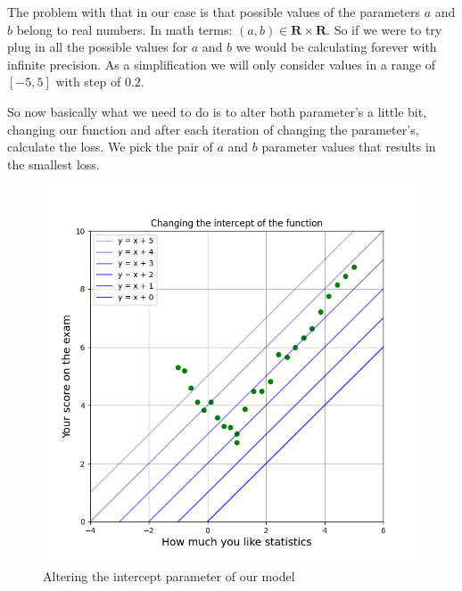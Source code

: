 \documentclass{article}
\begin{document}
    The problem with that in our case is that possible values of the parameters $a$ and $b$ belong to real numbers.
    In math terms: $(a, b) \in \mathbf{R}\times\mathbf{R}$.
    So if we were to try plug in all the possible values for $a$ and $b$ we would be calculating forever with infinite precision.
    As a simplification we will only consider values in a range of $[-5,5]$ with step of $0.2$.

    So now basically what we need to do is to alter both parameter's a little bit, changing our function and after each iteration of changing the parameter's, calculate the loss.
    We pick the pair of $a$ and $b$ parameter values that results in the smallest loss.

    \begin{figure}[h]
        \centering
        \begin{minipage}{0.4\textwidth}
            \centering
            \includegraphics[width=\linewidth]{../images/myplot3.png}
            \caption{Altering the intercept parameter of our model}
        \end{minipage}
        \hfill
        \begin{minipage}{0.4\textwidth}
            \centering

\end{minipage}
\end{figure}
\end{document}
